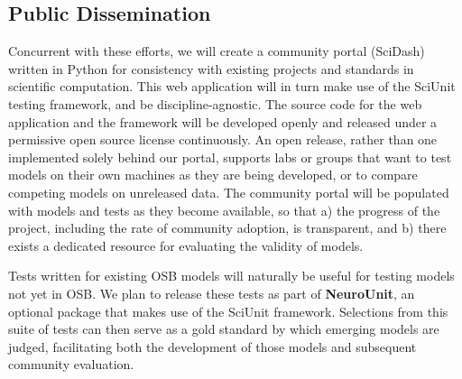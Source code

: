 \documentclass[11pt,letterpaper]{article}
\begin{document}
\subsection{Public Dissemination}
Concurrent with these efforts, we will create a community portal (SciDash) written in Python for consistency with existing projects and standards in scientific computation.  This web application will in turn make use of the SciUnit testing framework, and be discipline-agnostic.  The source code for the web application and the framework will be developed openly and released under a permissive open source license continuously. An open release, rather than one implemented solely behind our portal, supports labs or groups that want to test models on their own machines as they are being developed, or to compare competing models on unreleased data.  The community portal will be populated with models and tests as they become available, so that a) the progress of the project, including the rate of community adoption, is transparent, and b) there exists a dedicated resource for evaluating the validity of models.  

Tests written for existing OSB models will naturally be useful for testing models not yet in OSB.  We plan to release these tests as part of \textbf{NeuroUnit}, an optional package that makes use of the SciUnit framework.  Selections from this suite of tests can then serve as a gold standard by which emerging models are judged, facilitating both the development of those models and subsequent community evaluation.  
\end{document}
